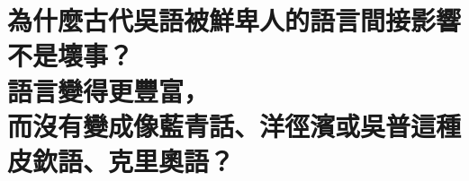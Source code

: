%

\chapter[為什麼古代吳語被鮮卑人的語言間接影響不是壞事？ 語言變得更豐富， 而沒有變成像藍青話、洋徑濱或吳普這種皮欽語、克里奧語？]{為什麼古代吳語被鮮卑人的語言間接影響不是壞事？ \\[0.35em] 語言變得更豐富， \\[0.35em] 而沒有變成像藍青話、洋徑濱或吳普這種皮欽語、克里奧語？}

